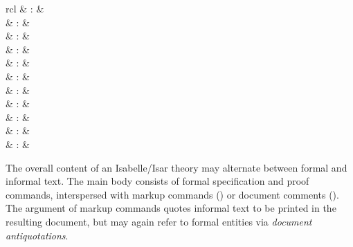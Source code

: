 \begin{isabellebody}
\begin{isamarkuptext}
\begin{matharray}{rcl}
    \hypertarget{antiquotation.type}{\hyperlink{antiquotation.type}{\mbox{}}} & : &  \\
    \hypertarget{antiquotation.class}{\hyperlink{antiquotation.class}{\mbox{}}} & : &  \\
    \hypertarget{antiquotation.text}{\hyperlink{antiquotation.text}{\mbox{}}} & : &  \\
    \hypertarget{antiquotation.goals}{\hyperlink{antiquotation.goals}{\mbox{}}} & : &  \\
    \hypertarget{antiquotation.subgoals}{\hyperlink{antiquotation.subgoals}{\mbox{}}} & : &  \\
    \hypertarget{antiquotation.prf}{\hyperlink{antiquotation.prf}{\mbox{}}} & : &  \\
    \hypertarget{antiquotation.full-prf}{\hyperlink{antiquotation.full-prf}{\mbox{}}} & : &  \\
    \hypertarget{antiquotation.ML}{\hyperlink{antiquotation.ML}{\mbox{}}} & : &  \\
    \hypertarget{antiquotation.ML-type}{\hyperlink{antiquotation.ML-type}{\mbox{}}} & : &  \\
    \hypertarget{antiquotation.ML-struct}{\hyperlink{antiquotation.ML-struct}{\mbox{}}} & : &  \\
    \hypertarget{antiquotation.file}{\hyperlink{antiquotation.file}{\mbox{}}} & : &  \\
  \end{matharray}

  The overall content of an Isabelle/Isar theory may alternate between
  formal and informal text.  The main body consists of formal
  specification and proof commands, interspersed with markup commands
  () or document comments ().
  The argument of markup commands quotes informal text to be printed
  in the resulting document, but may again refer to formal entities
  via \emph{document antiquotations}.


\end{isamarkuptext}
\end{isabellebody}
